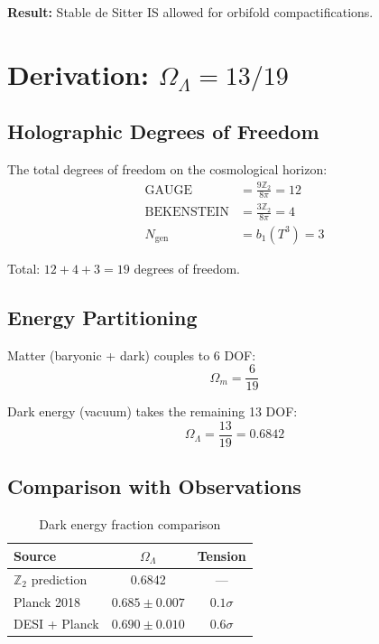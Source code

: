 \documentclass[12pt,a4paper]{article}
\begin{document}
\textbf{Result:} Stable de Sitter IS allowed for orbifold compactifications.

\section{Derivation: $\Omega_\Lambda = 13/19$}

\subsection{Holographic Degrees of Freedom}

The total degrees of freedom on the cosmological horizon:
\begin{align}
\text{GAUGE} &= \frac{9\mathbb{Z}_2}{8\pi} = 12 \\
\text{BEKENSTEIN} &= \frac{3\mathbb{Z}_2}{8\pi} = 4 \\
N_{\text{gen}} &= b_1(T^3) = 3
\end{align}

Total: $12 + 4 + 3 = 19$ degrees of freedom.

\subsection{Energy Partitioning}

Matter (baryonic + dark) couples to 6 DOF:
\begin{equation}
\Omega_m = \frac{6}{19}
\end{equation}

Dark energy (vacuum) takes the remaining 13 DOF:
\begin{equation}
\Omega_\Lambda = \frac{13}{19} = 0.6842
\end{equation}

\subsection{Comparison with Observations}

\begin{table}[h]
\centering
\begin{tabular}{lcc}
\toprule
Source & $\Omega_\Lambda$ & Tension \\
\midrule
$\mathbb{Z}_2$ prediction & 0.6842 & --- \\
Planck 2018 & $0.685 \pm 0.007$ & $0.1\sigma$ \\
DESI + Planck & $0.690 \pm 0.010$ & $0.6\sigma$ \\
\bottomrule
\end{tabular}
\caption{Dark energy fraction comparison}
\end{table}
\end{document}
